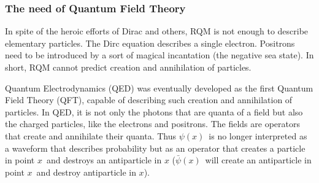 \begin{frame}
\frametitle{The need of Quantum Field Theory}
In spite of the heroic efforts of Dirac and others, RQM is not enough to describe elementary particles. The Dirc equation describes a single electron. Positrons need to be introduced by a sort of magical incantation (the negative sea state). In short, RQM cannot predict creation and annihilation of particles. 

Quantum Electrodynamics (QED) was eventually developed as the first Quantum Field Theory (QFT), capable of describing such creation and annihilation of particles. In QED, it is not only the photons that are quanta of a field but also the charged particles, like the electrons and positrons. The fields are operators that create and annihilate their quanta. \alert{Thus $\psi(x)$~is no longer interpreted as a waveform that describes probability but as an operator that creates a particle in point $x$~and destroys an antiparticle in $x$ ($\bar{\psi}(x)$~will create an antiparticle in point $x$~and destroy antiparticle in $x$)}.

%
%


\end{frame}

